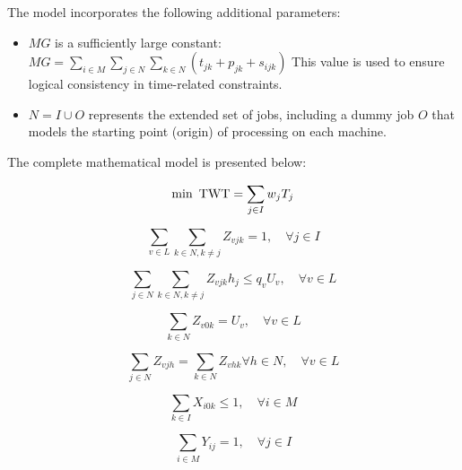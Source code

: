\documentclass{article}
\begin{document}
The model incorporates the following additional parameters:

\begin{itemize}
    \item $MG$ is a sufficiently large constant:
    $MG = \sum\limits_{i \in M}\sum\limits_{j \in N}\sum\limits_{k \in N} (t_{jk} + p_{jk} + s_{ijk})$
    This value is used to ensure logical consistency in time-related constraints.
    
    \item ${N = I \cup {O}}$ represents the extended set of jobs, including a dummy job $O$ that models the starting point (origin) of processing on each machine.
\end{itemize}

The complete mathematical model is presented below:

\begin{equation}
    \label{eq:objetivo}
    \min   \text{ TWT} = \sum\limits_{j \in I} w_{j}T_{j}     \\
\end{equation}

\begin{equation}
\label{eq:resticao1}
   \sum\limits_{v \in L} \sum\limits_{k \in N, k \neq j } Z_{vjk} = 1, \quad  \forall j \in I 
\end{equation}

\begin{equation}
\label{eq:resticao2}
  \sum\limits_{j \in N} \sum\limits_{k \in N, k \neq j } Z_{vjk} h_j \le q_v U_v,  \quad \forall v \in L 
\end{equation}

\begin{equation}
\label{eq:resticao4}
   \sum\limits_{k \in N}    Z_{v0k}  =  U_v, \quad   \forall v \in L 
\end{equation}

\begin{equation}
\label{eq:resticao5}
	\sum\limits_{j \in N}  Z_{vjh} = \sum\limits_{k \in N}  Z_{vhk}   \forall h \in N, \quad \forall v \in L 
\end{equation}

\begin{equation}
\label{eq:resticao6}
    \sum\limits_{k \in I} X_{i0k}   \leq  1,       \quad \forall i \in M
\end{equation}

\begin{equation}
\label{eq:resticao7}
	\sum\limits_{i \in M} Y_{ij}   =  1, \quad \forall j \in I
\end{equation}
\end{document}
